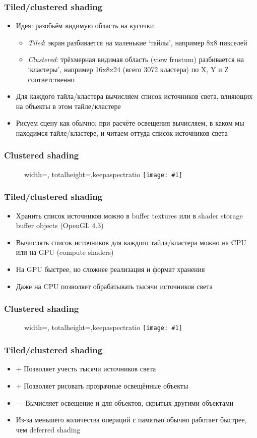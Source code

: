 \documentclass[10pt]{beamer}
\newcommand{\slideimage}[1]{
  \begin{figure}
    \begin{adjustbox}{width=\textwidth, totalheight=\textheight-2\baselineskip-2\baselineskip,keepaspectratio}
      \texttt{[image: \#1]}
    \end{adjustbox}
  \end{figure}
}
\begin{document}
\begin{frame}[fragile]
\frametitle{Tiled/clustered shading}
\begin{itemize}
\item Идея: разобьём видимую область на кусочки
\begin{itemize}
\item \textit{Tiled}: экран разбивается на маленькие `тайлы', например 8x8 пикселей
\item \textit{Clustered}: трёхмерная видимая область (view frustum) разбивается на `кластеры', например 16x8x24 (всего 3072 кластера) по X, Y и Z соответственно
\end{itemize}
\pause
\item Для каждого тайла/кластера вычисляем список источников света, влияющих на объекты в этом тайле/кластере
\pause
\item Рисуем сцену как обычно; при расчёте освещения вычисляем, в каком мы находимся тайле/кластере, и читаем оттуда список источников света
\end{itemize}
\end{frame}

\begin{frame}[fragile]
\frametitle{Clustered shading}
\slideimage{clustered.png}
\end{frame}

\begin{frame}[fragile]
\frametitle{Tiled/clustered shading}
\begin{itemize}
\item Хранить список источников можно в buffer textures или в shader storage buffer objects (OpenGL 4.3)
\pause
\item Вычислять список источников для каждого тайла/кластера можно на CPU или на GPU (compute shaders)
\pause
\item На GPU быстрее, но сложнее реализация и формат хранения
\pause
\item Даже на CPU позволяет обрабатывать тысячи источников света
\end{itemize}
\end{frame}

\begin{frame}[fragile]
\frametitle{Clustered shading}
\slideimage{clustered_mars.png}
\end{frame}

\begin{frame}[fragile]
\frametitle{Tiled/clustered shading}
\begin{itemize}
\item {\color{green}+} Позволяет учесть тысячи источников света
\item {\color{green}+} Позволяет рисовать прозрачные освещённые объекты
\item {\color{red}—} Вычисляет освещение и для объектов, скрытых другими объектами
\item Из-за меньшего количества операций с памятью обычно работает быстрее, чем deferred shading
\end{itemize}
\end{frame}
\end{document}

